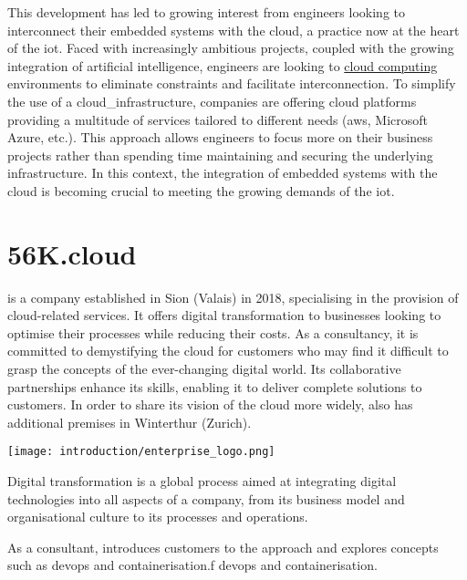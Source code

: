 This development has led to growing interest from engineers looking to interconnect their embedded systems with the \gls{cloud}, a practice now at the heart of the \acrfull{iot}. Faced with increasingly ambitious projects, coupled with the growing integration of artificial intelligence, engineers are looking to \hyperref[subsec:cloudcomputing]{cloud computing} environments to eliminate constraints and facilitate interconnection. To simplify the use of a \gls{cloud_infrastructure}, companies are offering \gls{cloud} platforms providing a multitude of services tailored to different needs (\gls{aws}, Microsoft Azure, etc.). This approach allows engineers to focus more on their business projects rather than spending time maintaining and securing the underlying infrastructure. In this context, the integration of embedded systems with the \gls{cloud} is becoming crucial to meeting the growing demands of the \acrshort{iot}.


\section{56K.\Gls{cloud}}
\label{subsec:56k.cloud}

 is a company established in Sion (Valais) in 2018, specialising in the provision of \gls{cloud}-related services. It offers digital transformation to businesses looking to optimise their processes while reducing their costs. As a consultancy, it is committed to demystifying the \gls{cloud} for customers who may find it difficult to grasp the concepts of the ever-changing digital world. Its collaborative partnerships enhance its skills, enabling it to deliver complete solutions to customers. In order to share its vision of the \gls{cloud} more widely,  also has additional premises in Winterthur (Zurich).
\begin{center}
    \begingroup
    \texttt{[image: introduction/enterprise\_logo.png]}
    \label{fig:enterprise_logo}
    \endgroup
\end{center}
Digital transformation is a global process aimed at integrating digital technologies into all aspects of a company, from its business model and organisational culture to its processes and operations.

As a consultant,  introduces customers to the  approach and explores concepts such as \acrshort{devops} and containerisation.f \acrshort{devops} and containerisation.



